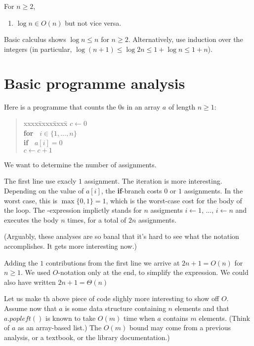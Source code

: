 \documentclass{tstextbook}
\begin{document}
\begin{example}
  For $n\geq 2$,
  \begin{enumerate}
    \item $\log n\in O(n)$ but not vice versa.
  \end{enumerate}
  Basic calculus shows $\log n \leq n$ for $n\geq 2$.
  Alternatively, use induction over the integers (in particular, $\log (n + 1) \leq \log 2n \leq 1 + \log n\leq 1 + n$).
\end{example}

\section{Basic programme analysis}

Here is a programme that counts the $0$s in an array $a$ of length $n\geq 1$:

\begin{quotation}
  \begin{tabbing}
    xxxx\=xxxx\=xxxx\=\kill
    $c \leftarrow{} 0$\\
    \textbf{for\ } $i\in \{1,\ldots,n\}$\\
    \> \textbf{if\ } $a[i] = 0$\\
    \>\> $c\leftarrow{} c + 1$\\
  \end{tabbing}
\end{quotation}

We want to determine the number of assignments.

The first line use exacly $1$ assignment.
The iteration is more interesting.
Depending on the value of $a[i]$, the \textbf{if}-branch costs $0$ or $1$ assignments.
In the worst case, this is $\max\{0,1\} = 1$, which is the worst-case cost for the body of the loop.
The -expression implictly stands for $n$ assigments $i\leftarrow 1$, $\ldots$, $i \leftarrow n$ and executes the body $n$ times, for a total of $2n$ assignments.

(Arguably, these analyses are so banal that it's hard to see what the notation accomplishes.
It gets more interesting now.)

Adding the $1$ contributions from the first line we arrive at $2n+1=  O(n)$ for $n\geq 1$.
We used $O$-notation only at the end, to simplify the expression.
We could also have written  $2n+1= \Theta(n)$

\bigskip

Let us make th above piece of code slighly more interesting to show off $O$.
Assume now that $a$ is some data structure containing $n$ elements and that $a.\mathit{popleft}()$ is known to take $O(m)$ time when $a$ contains $m$ elements.
(Think of $a$ as an array-based list.)
The $O(m)$ bound may come from a previous analysis, or a textbook, or the library documentation.)
\end{document}
